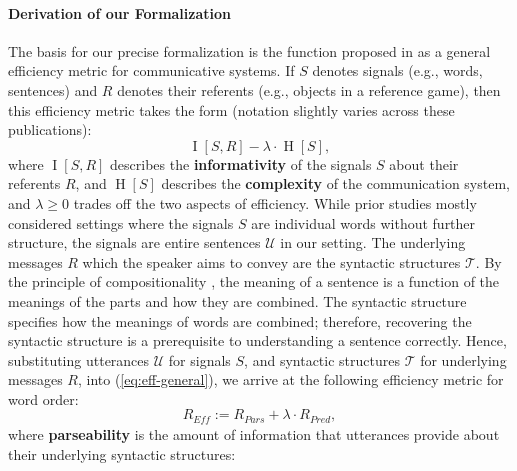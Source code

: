 \documentclass[10pt,twoside,lineno]{article}
\newcommand{\key}[1]{\textbf{#1}}
\newcommand{\utterance}{\mathcal{U}}
\newcommand{\tree}{\mathcal{T}}
\begin{document}
\paragraph{Derivation of our Formalization}
The basis for our precise formalization is the function proposed in \cite{ferreri2003least,ferrericancho2007global,futrell2017memory,peloquin2019interactions} as a general efficiency metric for communicative systems.
If $S$ denotes signals (e.g., words, sentences) and $R$ denotes their referents (e.g., objects in a reference game), then this efficiency metric takes the form (notation slightly varies across these publications):
\begin{equation}\label{eq:eff-general}
\operatorname{I}[S, R] - \lambda \cdot \operatorname{H}[S],
\end{equation}
where $\operatorname{I}[S, R]$ describes the \key{informativity} of the signals $S$ about their referents $R$, and $\operatorname{H}[S]$ describes the \key{complexity} of the communication system, and $\lambda \geq 0$ trades off the two aspects of efficiency.
While prior studies \cite{ferreri2003least, kemp2012kinship,regier2015word,zaslavsky2018efficient} mostly considered settings where the signals $S$ are individual words without further structure, the signals are entire sentences $\utterance$ in our setting.
The underlying messages $R$ which the speaker aims to convey are the syntactic structures $\tree$.
By the principle of compositionality \cite{frege1892sinn}, the meaning of a sentence is a function of the meanings of the parts and how they are combined.
The syntactic structure specifies how the meanings of words are combined; therefore, recovering the syntactic structure is a prerequisite to understanding a sentence correctly.
Hence, substituting utterances $\utterance$ for signals $S$, and syntactic structures $\tree$ for underlying messages $R$, into (\ref{eq:eff-general}), we  arrive at the following efficiency metric for word order:
\begin{equation}\label{eq:efficiency-derived}
	R_{\textit{Eff}} := R_{\textit{Pars}} + \lambda \cdot R_\textit{Pred},
\end{equation}
where \key{parseability} is the amount of information that utterances provide about their underlying syntactic structures:
\end{document}
